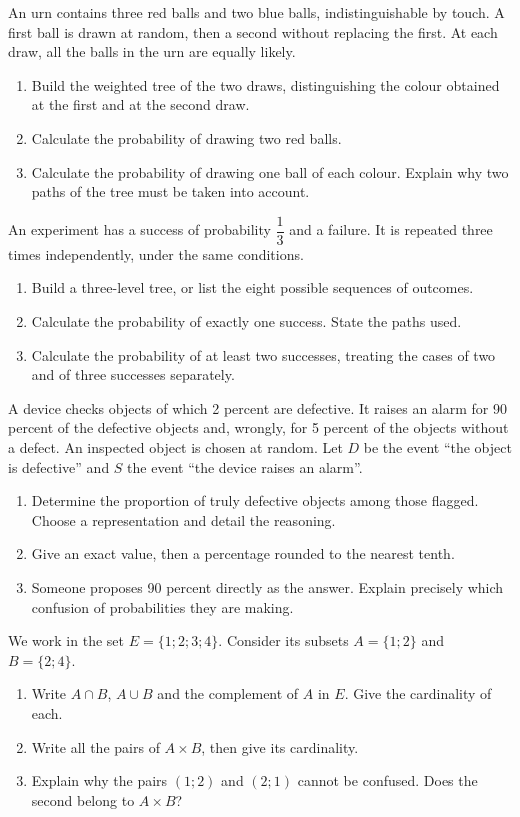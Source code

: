 An urn contains three red balls and two blue balls, indistinguishable by touch. A first ball is drawn at random, then a second without replacing the first. At each draw, all the balls in the urn are equally likely.
\begin{enumerate}[label=\arabic*.]
\item Build the weighted tree of the two draws, distinguishing the colour obtained at the first and at the second draw.
\item Calculate the probability of drawing two red balls.
\item Calculate the probability of drawing one ball of each colour. Explain why two paths of the tree must be taken into account.
\end{enumerate}
An experiment has a success of probability $\dfrac13$ and a failure. It is repeated three times independently, under the same conditions.
\begin{enumerate}[label=\arabic*.]
\item Build a three-level tree, or list the eight possible sequences of outcomes.
\item Calculate the probability of exactly one success. State the paths used.
\item Calculate the probability of at least two successes, treating the cases of two and of three successes separately.
\end{enumerate}
A device checks objects of which 2 percent are defective. It raises an alarm for 90 percent of the defective objects and, wrongly, for 5 percent of the objects without a defect. An inspected object is chosen at random. Let $D$ be the event ``the object is defective'' and $S$ the event ``the device raises an alarm''.
\begin{enumerate}[label=\arabic*.]
\item Determine the proportion of truly defective objects among those flagged. Choose a representation and detail the reasoning.
\item Give an exact value, then a percentage rounded to the nearest tenth.
\item Someone proposes 90 percent directly as the answer. Explain precisely which confusion of probabilities they are making.
\end{enumerate}
We work in the set $E=\{1;2;3;4\}$. Consider its subsets $A=\{1;2\}$ and $B=\{2;4\}$.
\begin{enumerate}[label=\arabic*.]
\item Write $A\cap B$, $A\cup B$ and the complement of $A$ in $E$. Give the cardinality of each.
\item Write all the pairs of $A\times B$, then give its cardinality.
\item Explain why the pairs $(1;2)$ and $(2;1)$ cannot be confused. Does the second belong to $A\times B$?
\end{enumerate}
